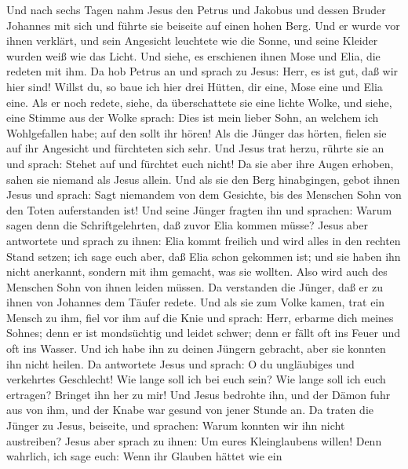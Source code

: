  Und nach sechs Tagen nahm Jesus den Petrus und Jakobus
und dessen Bruder Johannes mit sich und führte sie beiseite auf einen
hohen Berg.  Und er wurde vor ihnen verklärt, und sein
Angesicht leuchtete wie die Sonne, und seine Kleider wurden weiß wie das
Licht.  Und siehe, es erschienen ihnen Mose und Elia, die
redeten mit ihm.  Da hob Petrus an und sprach zu Jesus:
Herr, es ist gut, daß wir hier sind! Willst du, so baue ich hier drei
Hütten, dir eine, Mose eine und Elia eine.  Als er noch
redete, siehe, da überschattete sie eine lichte Wolke, und siehe, eine
Stimme aus der Wolke sprach: Dies ist mein lieber Sohn, an welchem ich
Wohlgefallen habe; auf den sollt ihr hören!  Als die
Jünger das hörten, fielen sie auf ihr Angesicht und fürchteten sich
sehr.  Und Jesus trat herzu, rührte sie an und sprach:
Stehet auf und fürchtet euch nicht!  Da sie aber ihre
Augen erhoben, sahen sie niemand als Jesus allein.  Und
als sie den Berg hinabgingen, gebot ihnen Jesus und sprach: Sagt
niemandem von dem Gesichte, bis des Menschen Sohn von den Toten
auferstanden ist!  Und seine Jünger fragten ihn und
sprachen: Warum sagen denn die Schriftgelehrten, daß zuvor Elia kommen
müsse?  Jesus aber antwortete und sprach zu ihnen: Elia
kommt freilich und wird alles in den rechten Stand setzen;
 ich sage euch aber, daß Elia schon gekommen ist; und sie
haben ihn nicht anerkannt, sondern mit ihm gemacht, was sie wollten.
Also wird auch des Menschen Sohn von ihnen leiden müssen.
 Da verstanden die Jünger, daß er zu ihnen von Johannes
dem Täufer redete.  Und als sie zum Volke kamen, trat ein
Mensch zu ihm, fiel vor ihm auf die Knie  und sprach:
Herr, erbarme dich meines Sohnes; denn er ist mondsüchtig und leidet
schwer; denn er fällt oft ins Feuer und oft ins Wasser. 
Und ich habe ihn zu deinen Jüngern gebracht, aber sie konnten ihn nicht
heilen.  Da antwortete Jesus und sprach: O du ungläubiges
und verkehrtes Geschlecht! Wie lange soll ich bei euch sein? Wie lange
soll ich euch ertragen? Bringet ihn her zu mir!  Und
Jesus bedrohte ihn, und der Dämon fuhr aus von ihm, und der Knabe war
gesund von jener Stunde an.  Da traten die Jünger zu
Jesus, beiseite, und sprachen: Warum konnten wir ihn nicht austreiben?
 Jesus aber sprach zu ihnen: Um eures Kleinglaubens
willen! Denn wahrlich, ich sage euch: Wenn ihr Glauben hättet wie ein
